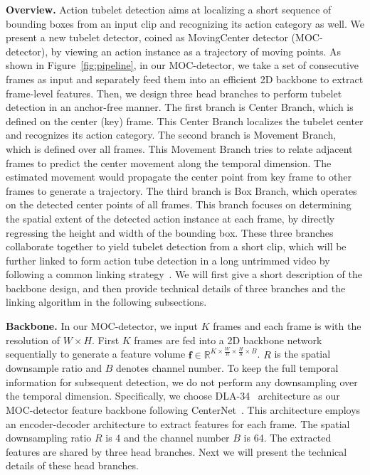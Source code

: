 \documentclass[runningheads]{llncs}
\begin{document}
{\bf Overview.} Action tubelet detection aims at localizing a short sequence of bounding boxes from an input clip and recognizing its action category as well. We present a new tubelet detector, coined as {MovingCenter detector} (MOC-detector), by viewing an action instance as a trajectory of moving points. As shown in Figure~\ref{fig:pipeline}, in our MOC-detector, we take a set of consecutive frames as input and separately feed them into an efficient 2D backbone to extract frame-level features. Then, we design three head branches to perform tubelet detection in an anchor-free manner. The first branch is Center Branch, which is defined on the center (key) frame. This Center Branch localizes the tubelet center and recognizes its action category. The second branch is Movement Branch, which is defined over all frames. This Movement Branch tries to relate adjacent frames to predict the center movement along the temporal dimension. The estimated movement would propagate the center point from key frame to other frames to generate a trajectory. The third branch is Box Branch, which operates on the detected center points of all frames. This branch focuses on determining the spatial extent of the detected action instance at each frame, by directly regressing the height and width of the bounding box. These three branches collaborate together to yield tubelet detection from a short clip, which will be further linked to form action tube detection in a long untrimmed video by following a common linking strategy~\cite{kalogeiton2017action}. We will first give a short description of the backbone design, and then provide technical details of three branches and the linking algorithm in the following subsections.

{\bf Backbone.} In our MOC-detector, we input $K$ frames and each frame is with the resolution of $W \times H$.  First $K$ frames are fed into a 2D backbone network sequentially to generate a feature volume $\mathbf{f} \in \mathbb{R}^{K \times\frac{W}{R} \times \frac{H}{R} \times B}$. $R$ is the spatial downsample ratio and $B$ denotes channel number. To keep the full temporal information for subsequent detection, we do not perform any downsampling over the temporal dimension. Specifically, we choose DLA-34~\cite{DLA} architecture as our MOC-detector feature backbone following CenterNet~\cite{CenterNet}.
This architecture employs an encoder-decoder architecture to extract features for each frame. The spatial downsampling ratio $R$ is 4 and the channel number $B$ is 64. The extracted features are shared by three head branches.
Next we will present the technical details of these head branches.
\end{document}
